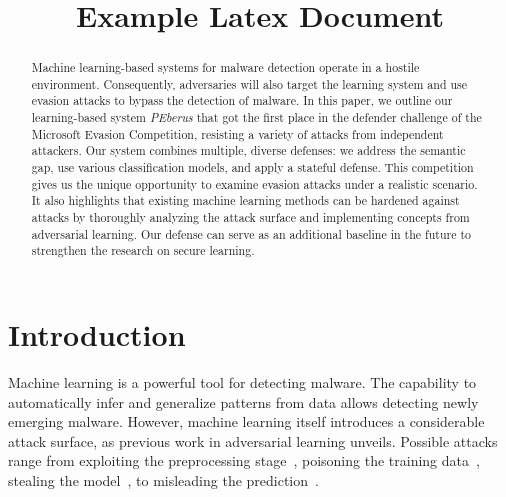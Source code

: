 \documentclass[conference]{IEEEtran}
\newif\ifsubmission
\newcommand{\defnameit}{\textit{PEberus}\xspace}
\begin{document}
\title{Example Latex Document}



 \author{
	\vspace{0.2cm}
}



\maketitle
\ifsubmission\else
  \thispagestyle{plain}
  \pagestyle{plain}
\fi



\begin{abstract}
Machine learning-based systems for malware detection operate in a 
hostile environment. 
Consequently, adversaries will also target the learning system and use 
evasion attacks to bypass the detection of malware. 
In this paper, we outline our learning-based system \defnameit that
got the first place in the defender challenge of the Microsoft Evasion
Competition, resisting a variety of attacks from independent
attackers.  Our system combines multiple, diverse defenses: we address
the semantic gap, use various classification models, and apply a
stateful defense.  This competition gives us the unique opportunity to
examine evasion attacks under a realistic scenario. It also highlights
that existing machine learning methods can be hardened against attacks
by thoroughly analyzing the attack surface and implementing
concepts from adversarial learning.  Our defense can serve as an
additional baseline in the future to strengthen the research on secure
learning.
\end{abstract}


\section{Introduction}

Machine learning is a powerful tool for detecting malware. The 
capability to automatically infer and generalize patterns from data 
allows detecting newly emerging malware.
However, machine learning itself introduces a considerable attack 
surface, as previous work in adversarial learning unveils.  
Possible attacks range from exploiting the preprocessing
stage~\citep{QuiKleArpJohRie18, XiaCheShe+19}, poisoning the training
data~\citep[e.g.,][]{BigNelLas11, GuDolGar17, LiuMaAaf+18}, stealing
the model~\citep{TraZhaJuel+16}, to misleading the
prediction~\citep[e.g.,][]{BigCorMai+13, CarWag17}.
\end{document}
